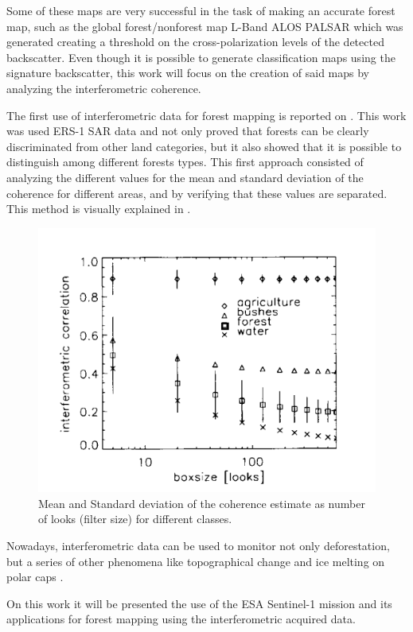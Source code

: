 Some of these maps are very successful in the task of making an accurate forest map, such as the global forest/nonforest map L-Band ALOS PALSAR which was generated creating a threshold on the cross-polarization levels of the detected backscatter. Even though it is possible to generate classification maps using the signature backscatter, this work will focus on the creation of said maps by analyzing the interferometric coherence.

The first use of interferometric data for forest mapping is reported on \cite{first_interferometric}. This work was used  ERS-1 SAR data and not only proved that forests can be clearly discriminated from other land categories, but it also showed that it is possible to distinguish among different forests types. This first approach consisted of analyzing the different values for the mean and standard deviation of the coherence for different areas, and by verifying that these values are separated. This method is visually explained in .

\begin{figure}[H]
    \centering
    \includegraphics[width=0.7\linewidth]{Cap2/first_interferometric.png}
    \caption{Mean and Standard deviation of the coherence estimate as number of looks (filter size) for different classes.}
    \label{fig:first_interferometric_estimate}
\end{figure}

Nowadays, interferometric data can be used to monitor not only deforestation, but a series of other phenomena like topographical change and ice melting on polar caps \cite{Paolathesis}. 

On this work it will be presented the use of the ESA Sentinel-1 mission and its applications for forest mapping using the interferometric acquired data.

